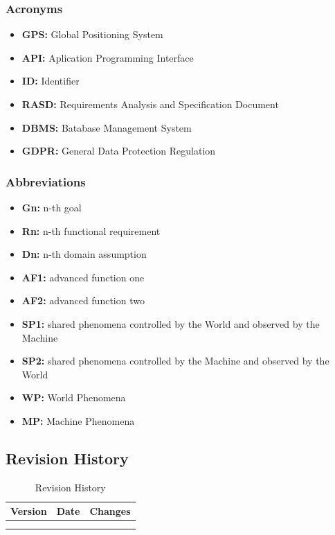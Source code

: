 \documentclass {article}
\begin{document}
		\subsubsection{Acronyms}
		
			\begin{itemize}
				\item {\bf GPS:} Global Positioning System
				\item {\bf API:} Aplication Programming Interface
				\item {\bf ID:} Identifier
				\item {\bf RASD:} Requirements Analysis and 								Specification Document
				\item {\bf DBMS:} Batabase Management System
				\item {\bf GDPR:} General Data Protection Regulation
			\end{itemize}

				
				
		\subsubsection{Abbreviations}
		
			\begin{itemize}
				\item {\bf Gn:} n-th goal
				\item {\bf Rn:} n-th functional requirement
				\item {\bf Dn:} n-th domain assumption
				\item {\bf AF1:} advanced function one
				\item {\bf AF2:} advanced function two
				\item {\bf SP1:} shared phenomena controlled by the 						World and observed by the Machine
				\item {\bf SP2:} shared phenomena controlled by the 						Machine and observed by the World
				\item {\bf WP:} World Phenomena
				\item {\bf MP:} Machine Phenomena
			\end{itemize}
			

	\subsection{Revision History}
	
	\begin{table}[ht]
		\centering
		\begin{tabular}{ccc} 
		Version & Date & Changes  \\ 
		\hline
		 \\
		 \\
		\end{tabular}
		\caption{Revision History}
		\label{default}
	\end{table}
	
\end{document}
